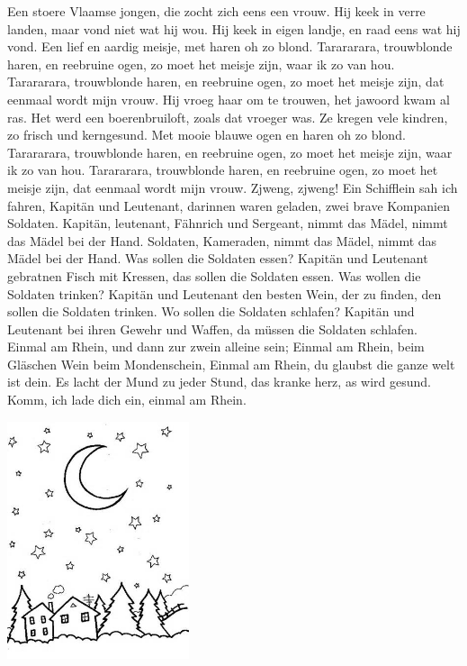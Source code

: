 \documentclass{article}
\begin{document}
\begin{songs}{}
\beginverse*
Een stoere Vlaamse jongen,
die zocht zich eens een vrouw.
Hij keek in verre landen,
maar vond niet wat hij wou.
Hij keek in eigen landje,
en raad eens wat hij vond.
Een lief en aardig meisje,
met haren oh zo blond.
\endverse
\beginverse*
Tarararara, trouwblonde haren,
en reebruine ogen,
zo moet het meisje zijn,
waar ik zo van hou.
Tarararara, trouwblonde haren,
en reebruine ogen,
zo moet het meisje zijn,
dat eenmaal wordt mijn vrouw.
\endverse
\beginverse*
Hij vroeg haar om te trouwen,
het jawoord kwam al ras.
Het werd een boerenbruiloft,
zoals dat vroeger was.
Ze kregen vele kindren,
zo frisch und kerngesund.
Met mooie blauwe ogen 
en haren oh zo blond.
\endverse
\beginverse*
Tarararara, trouwblonde haren,
en reebruine ogen,
zo moet het meisje zijn,
waar ik zo van hou.
Tarararara, trouwblonde haren,
en reebruine ogen,
zo moet het meisje zijn,
dat eenmaal wordt mijn vrouw.
\endverse
\beginverse*
Zjweng, zjweng!
\endverse
\endsong
{}
\beginverse*
Ein Schifflein sah ich fahren, Kapitän und Leutenant,
darinnen waren geladen, zwei brave Kompanien Soldaten.
\endverse
\beginverse*
Kapitän, leutenant, Fähnrich und Sergeant,
nimmt das Mädel, nimmt das Mädel bei der Hand.
Soldaten, Kameraden, nimmt das Mädel,
nimmt das Mädel bei der Hand.
\endverse
\beginverse*
Was sollen die Soldaten essen? Kapitän und Leutenant
gebratnen Fisch mit Kressen, das sollen die Soldaten essen.
\endverse
\beginverse*
Was wollen die Soldaten trinken? Kapitän und Leutenant
den besten Wein, der zu finden, den sollen die Soldaten trinken.
\endverse
\beginverse*
Wo sollen die Soldaten schlafen? Kapitän und Leutenant
bei ihren Gewehr und Waffen, da müssen die Soldaten schlafen.
\endverse
\endsong
{}
\beginverse*
Einmal am Rhein, und dann zur zwein alleine sein;
Einmal am Rhein, beim Gläschen Wein beim Mondenschein,
Einmal am Rhein, du glaubst die ganze welt ist dein.
Es lacht der Mund zu jeder Stund, das kranke herz, as wird gesund.
Komm, ich lade dich ein, einmal am Rhein.
\endverse
\endsong
\begin{intersong}
    \includegraphics[width=0.4\textwidth]{ensavonds}

\end{intersong}
\end{songs}
\end{document}
